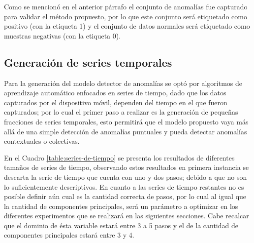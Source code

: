 Como se mencion\'{o} en el anterior p\'{a}rrafo el conjunto de anomal\'{i}as fue capturado para validar el m\'{e}todo propuesto, por lo que este conjunto ser\'{a} etiquetado como positivo (con la etiqueta 1) y el conjunto de datos normales ser\'{a} etiquetado como muestras negativas (con la etiqueta 0).

\subsection{Generaci\'{o}n de series temporales}

Para la generaci\'{o}n del modelo detector de anomal\'{i}as se opt\'{o} por algoritmos de aprendizaje autom\'{a}tico enfocados en series de tiempo, dado que los datos capturados por el dispositivo m\'{o}vil, dependen del tiempo en el que fueron capturados; por lo cual el primer paso a realizar es la generaci\'{o}n de peque\~{n}as fracciones de series temporales, esto permitir\'{a} que el modelo propuesto vaya m\'{a}s all\'{a} de una simple detecci\'{o}n de anomal\'{i}as puntuales y pueda detectar anomal\'{i}as contextuales o colectivas.

\vspace{5mm} %

En el Cuadro \ref{table:series-de-tiempo} se presenta los resultados de diferentes tama\~{n}os de series de tiempo, observando estos resultados en primera instancia se descarta la serie de tiempo que cuenta con uno y dos pasos; debido a que no son lo suficientemente descriptivos. En cuanto a las series de tiempo restantes no es posible definir a\'{u}n cual es la cantidad correcta de pasos, por lo cual al igual que la cantidad de componentes principales, ser\'{a} un par\'{a}metro a optimizar en los diferentes experimentos que se realizar\'{a} en las siguientes secciones. Cabe recalcar que el dominio de \'{e}sta variable estar\'{a} entre 3 a 5 pasos y el de la cantidad de componentes principales estar\'{a} entre 3 y 4.

